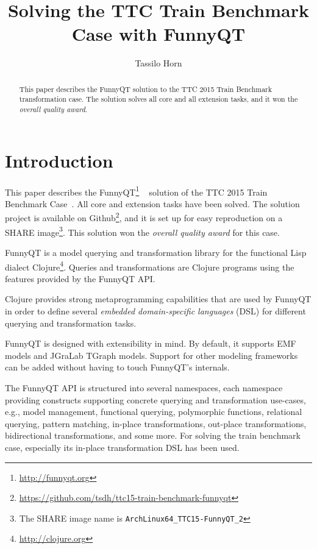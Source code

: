 \documentclass[submission]{eptcs}
\title{Solving the TTC Train Benchmark Case with FunnyQT}
\author{Tassilo Horn
  \institute{Institute for Software Technology, University Koblenz-Landau, Germany}
  \email{horn@uni-koblenz.de}}
\begin{document}
\maketitle

\begin{abstract}
  This paper describes the FunnyQT solution to the TTC 2015 Train Benchmark
  transformation case.  The solution solves all core and all extension tasks,
  and it won the \emph{overall quality award}.
\end{abstract}


\section{Introduction}
\label{sec:introduction}

This paper describes the FunnyQT\footnote{\url{http://funnyqt.org}}
~\cite{Horn2013MQWFQ,funnyqt-icgt15} solution of the TTC 2015 Train Benchmark
Case~\cite{train-benchmark-case-desc}.  All core and extension tasks have been
solved.  The solution project is available on
Github\footnote{\url{https://github.com/tsdh/ttc15-train-benchmark-funnyqt}},
and it is set up for easy reproduction on a SHARE image\footnote{The SHARE
  image name is \verb|ArchLinux64_TTC15-FunnyQT_2|}.  This solution won the
\emph{overall quality award} for this case.

FunnyQT is a model querying and transformation library for the functional Lisp
dialect Clojure\footnote{\url{http://clojure.org}}.  Queries and
transformations are Clojure programs using the features provided by the FunnyQT
API.

Clojure provides strong metaprogramming capabilities that are used by FunnyQT
in order to define several \emph{embedded domain-specific languages} (DSL) for
different querying and transformation tasks.

FunnyQT is designed with extensibility in mind.  By default, it supports EMF
models and JGraLab TGraph models.  Support for other modeling frameworks can be
added without having to touch FunnyQT's internals.

The FunnyQT API is structured into several namespaces, each namespace providing
constructs supporting concrete querying and transformation use-cases, e.g.,
model management, functional querying, polymorphic functions, relational
querying, pattern matching, in-place transformations, out-place
transformations, bidirectional transformations, and some more.  For solving the
train benchmark case, especially its in-place transformation DSL has been used.
\end{document}
